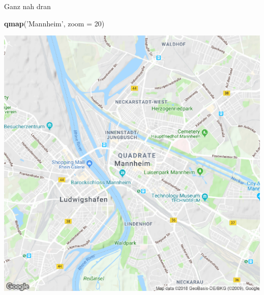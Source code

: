 \documentclass[ignorenonframetext,]{beamer}
\newenvironment{Shaded}{\begin{snugshade}}{\end{snugshade}}
\newcommand{\KeywordTok}[1]{\textcolor[rgb]{0.13,0.29,0.53}{\textbf{#1}}}
\newcommand{\DataTypeTok}[1]{\textcolor[rgb]{0.13,0.29,0.53}{#1}}
\newcommand{\DecValTok}[1]{\textcolor[rgb]{0.00,0.00,0.81}{#1}}
\newcommand{\StringTok}[1]{\textcolor[rgb]{0.31,0.60,0.02}{#1}}
\newcommand{\NormalTok}[1]{#1}
\begin{document}
\begin{frame}[fragile]{Ganz nah dran}

\begin{Shaded}
\begin{Highlighting}[]
\KeywordTok{qmap}\NormalTok{(}\StringTok{'Mannheim'}\NormalTok{, }\DataTypeTok{zoom =} \DecValTok{20}\NormalTok{)}
\end{Highlighting}
\end{Shaded}

\includegraphics{figure/ham_map_z20.pdf}

\end{frame}
\end{document}
